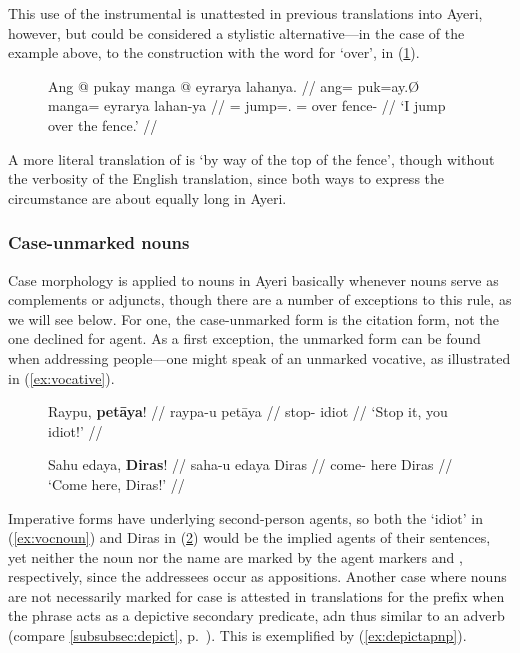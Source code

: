 This use of the instrumental is unattested in previous translations into Ayeri,
however, but could be considered a stylistic alternative---in the case of the
example above, to the construction with the word for `over',
 in (\ref{ex:vialoc}).

\begin{figure}[h]
\ex\label{ex:vialoc}
\begingl
	\gla Ang @ pukay manga @ eyrarya lahanya. //
	\glb ang= puk=ay.Ø manga= eyrarya lahan-ya //
	\glc \AgtT{}= jump=\Fsg{}.\Top{} \Dir{}= over fence-\Loc{} //
	\glft `I jump over the fence.' //
\endgl\xe
\end{figure}

A more literal translation of  is `by
way of the top of the fence', though without the verbosity of the English
translation, since both ways to express the circumstance are about equally long
in Ayeri.


\subsubsection{Case-unmarked nouns}
\label{subsec:uncased}

Case morphology is applied to nouns in Ayeri basically whenever nouns serve as
complements or adjuncts, though there are a number of exceptions to this rule,
as we will see below. For one, the case-unmarked form is the citation form, not
the one declined for agent. As a first exception, the unmarked form can be
found when addressing people---one might speak of an unmarked vocative, as
illustrated in (\ref{ex:vocative}).

\begin{figure}[h]
\pex\label{ex:vocative}
\a\label{ex:vocnoun}\begingl
	\gla Raypu, \textbf{petāya}! //
	\glb raypa-u petāya //
	\glc stop-\Imp{} idiot //
	\glft `Stop it, you idiot!' //
\endgl

\a\label{ex:vocname}\begingl
	\gla Sahu edaya, \textbf{Diras}! //
	\glb saha-u edaya Diras //
	\glc come-\Imp{} here Diras //
	\glft `Come here, Diras!' //
\endgl
\xe
\end{figure}

Imperative forms have underlying second-person agents, so both the `idiot' in
(\ref{ex:vocnoun}) and Diras in (\ref{ex:vocname}) would be the implied agents
of their sentences, yet neither the noun nor the name are marked by the agent
markers  and , respectively, since the
addressees occur as appositions. Another case where nouns are not necessarily
marked for case is attested in translations for the prefix
 when the phrase acts as a depictive secondary
predicate, adn thus similar to an adverb (compare \autoref{subsubsec:depict},
p.~\pageref{subsubsec:depict}). This is exemplified by
(\ref{ex:depictapnp}).

